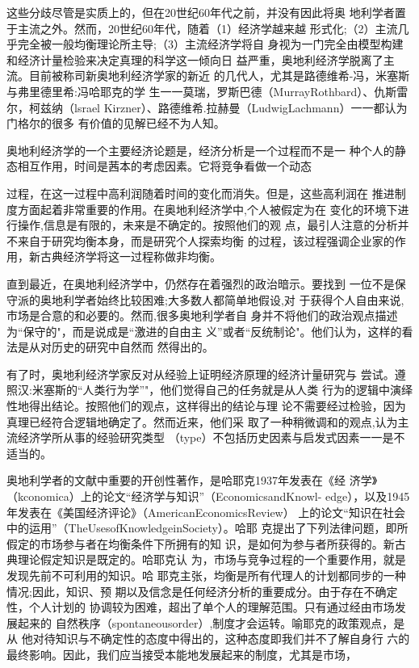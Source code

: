 这些分歧尽管是实质上的，但在20世纪60年代之前，并没有因此将奥
地利学者置于主流之外。然而，20世纪60年代，随着（1）经济学越来越
形式化;（2）主流几乎完全被一般均衡理论所主导;（3）主流经济学将自
身视为一门完全由模型构建和经济计量检验来决定真理的科学这一倾向日
益严重，奥地利经济学脱离了主流。目前被称司新奥地利经济学家的新近
的几代人，尤其是路德维希-冯，米塞斯与弗里德里希:冯哈耶克的学
生一一莫瑞，罗斯巴德（MurrayRothbard）、仇斯雷尔，柯兹纳（lsrael
Kirzner）、路德维希.拉赫曼（LudwigLachmann）一一都认为门格尔的很多
有价值的见解已经不为人知。

奥地利经济学的一个主要经济论题是，经济分析是一个过程而不是一
种个人的静态相互作用，时间是茜本的考虑因素。它将竞争看做一个动态

过程，在这一过程中高利润随着时间的变化而消失。但是，这些高利润在
推进制度方面起着非常重要的作用。在奥地利经济学中,个人被假定为在
变化的环境下进行操作,信息是有限的，未来是不确定的。按照他们的观
点，最引人注意的分析并不来自于研究均衡本身，而是研究个人探索均衡
的过程，该过程强调企业家的作用，新古典经济学将这一过程称做非均衡。

直到最近，在奥地利经济学中，仍然存在着强烈的政治暗示。要找到
一位不是保守派的奥地利学者始终比较困难;大多数人都简单地假设,对
于获得个人自由来说,市场是合意的和必要的。然而,很多奥地利学者自
身并不将他们的政治观点描述为“保守的"，而是说成是“激进的自由主
义”或者“反统制论"。他们认为，这样的看法是从对历史的研究中自然而
然得出的。

有了时，奥地利经济学家反对从经验上证明经济原理的经济计量研究与
尝试。遵照汉:米塞斯的“人类行为学”"，他们觉得自己的任务就是从人类
行为的逻辑中演绎性地得出结论。按照他们的观点，这样得出的结论与理
论不需要经过检验，因为真理已经符合逻辑地确定了。然而近来，他们采
取了一种稍微调和的观点,认为主流经济学所从事的经验研究类型
（type）不包括历史因素与启发式因素一一是不适当的。

奥地利学者的文献中重要的开创性著作，是哈耶克1937年发表在《经
济学》（kconomica）上的论文“经济学与知识”（EconomicsandKnowl-
edge），以及1945年发表在《美国经济评论》（AmericanEconomicsReview）
上的论文“知识在社会中的运用”（TheUsesofKnowledgeinSociety）。哈耶
克提出了下列法律问题，即所假定的市场参与者在均衡条件下所拥有的知
识，是如何为参与者所获得的。新古典理论假定知识是既定的。哈耶克认
为，市场与竞争过程的一个重要作用，就是发现先前不可利用的知识。哈
耶克主张，均衡是所有代理人的计划都同步的一种情况;因此，知识、预
期以及信念是任何经济分析的重要成分。由于存在不确定性，个人计划的
协调较为困难，超出了单个人的理解范围。只有通过经由市场发展起来的
自然秩序（spontaneousorder）,制度才会运转。喻耶克的政策观点，是从
他对待知识与不确定性的态度中得出的，这种态度即我们并不了解自身行
六的最终影响。因此，我们应当接受本能地发展起来的制度，尤其是市场，




